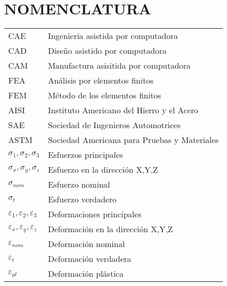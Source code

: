 \chapter*{NOMENCLATURA}




\begin{table}[h]
\def\arraystretch{1.15}
\begin{tabular}{p{4cm} p{12cm}}

CAE      &                       		      Ingeniería asistida por computadora \\
CAD &                                  		  Diseño asistido por computadora \\
CAM & 										  Manufactura asisitida por computadora \\
FEA &                                  		  Análisis por elementos finitos \\
FEM & 							              Método de los elementos finitos \\
AISI &                                        Instituto Americano del Hierro y el Acero \\
SAE &                                         Sociedad de Ingenieros Automotrices \\
ASTM &                                        Sociedad Americana para Pruebas y Materiales \\
$\sigma_1, \sigma_2, \sigma_3$ &              Esfuerzos principales \\
$\sigma_x, \sigma_y, \sigma_z$ &			  Esfuerzo en la dirección X,Y,Z \\
$\sigma_{nom}$ & 							  Esfuerzo nominal \\
$\sigma_{t}$ & 								  Esfuerzo verdadero \\
$\varepsilon_1, \varepsilon_2, \varepsilon_3$ & Deformaciones principales \\
$\varepsilon_x, \varepsilon_y, \varepsilon_z$ & Deformación en la dirección X,Y,Z \\
$\varepsilon_{nom} $ &						  Deformación nominal \\
$\varepsilon_{t}$ &  						  Deformación verdadera \\
$\varepsilon_{pl}$ & 						  Deformación plástica \\

\end{tabular}
\end{table}
